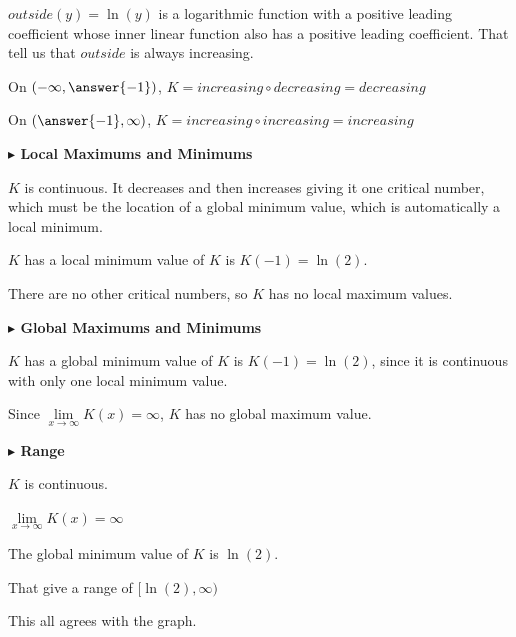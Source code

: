 \documentclass{ximera}
\begin{document}
\begin{example}
$outside(y) = \ln(y)$ is a logarithmic function with a positive leading coefficient whose inner linear function also has a positive leading coefficient. That tell us that $outside$ is always increasing. 


On $\left( -\infty, \answer{-1} \right)$, $K = increasing \circ decreasing = decreasing$


On $\left( \answer{-1}, \infty \right)$, $K = increasing \circ increasing = increasing$









\textbf{\textcolor{blue!55!black}{$\blacktriangleright$ Local Maximums and Minimums}} 


$K$ is continuous.  It decreases and then increases giving it one critical number, which must be the location of a global minimum value, which is automatically a local minimum. 

$K$ has a local minimum value of $K$ is $K(-1) = \ln(2)$. 


There are no other critical numbers, so $K$ has no local maximum values. 






\textbf{\textcolor{blue!55!black}{$\blacktriangleright$ Global Maximums and Minimums}} 


$K$ has a global minimum value of $K$ is $K(-1) = \ln(2)$, since it is continuous with only one local minimum value. 




Since $\lim\limits_{x \to \infty}K(x) = \infty$, $K$ has no global maximum value.












\textbf{\textcolor{blue!55!black}{$\blacktriangleright$ Range}} 


$K$ is continuous. 

$\lim\limits_{x \to \infty}K(x) = \infty$ 

The global minimum value of $K$ is $\ln(2)$. 



That give a range of  $[ \ln(2), \infty )$








This all agrees with the graph.







\end{example}
\end{document}
